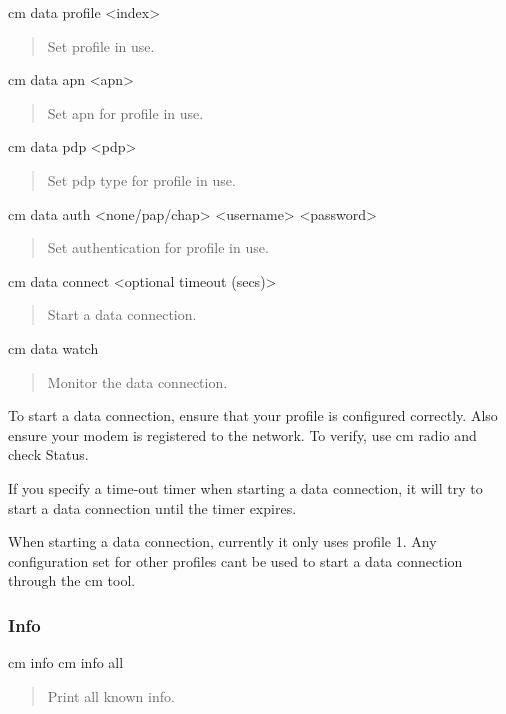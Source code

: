 \begin{DoxyVerb}cm data profile <index> \end{DoxyVerb}
 \begin{quote}
Set profile in use. \end{quote}


\begin{DoxyVerb}cm data apn <apn> \end{DoxyVerb}
 \begin{quote}
Set apn for profile in use. \end{quote}


\begin{DoxyVerb}cm data pdp <pdp> \end{DoxyVerb}
 \begin{quote}
Set pdp type for profile in use. \end{quote}


\begin{DoxyVerb}cm data auth <none/pap/chap> <username> <password> \end{DoxyVerb}
 \begin{quote}
Set authentication for profile in use. \end{quote}


\begin{DoxyVerb}cm data connect <optional timeout (secs)> \end{DoxyVerb}
 \begin{quote}
Start a data connection. \end{quote}


\begin{DoxyVerb}cm data watch \end{DoxyVerb}
 \begin{quote}
Monitor the data connection. \end{quote}


To start a data connection, ensure that your profile is configured correctly. Also ensure your modem is registered to the network. To verify, use {\ttfamily cm radio} and check {\ttfamily Status}.

If you specify a time-\/out timer when starting a data connection, it will try to start a data connection until the timer expires.

When starting a data connection, currently it only uses profile 1. Any configuration set for other profiles can\textquotesingle{}t be used to start a data connection through the cm tool.\hypertarget{tools_target_cm_toolsTarget_cm_info}{}\subsubsection{Info}\label{tools_target_cm_toolsTarget_cm_info}
\begin{DoxyVerb}cm info
cm info all \end{DoxyVerb}
 \begin{quote}
Print all known info. \end{quote}


